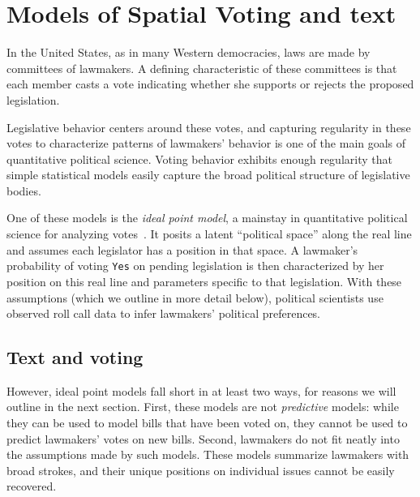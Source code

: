 \chapter{Models of Spatial Voting and text}
\label{chapter:spatial_voting}

In the United States, as in many Western democracies, laws are made by
committees of lawmakers.  A defining characteristic of these
committees is that each member casts a vote indicating whether she
supports or rejects the proposed legislation.

Legislative behavior centers around these votes, and capturing
regularity in these votes to characterize patterns of lawmakers'
behavior is one of the main goals of quantitative political science.
Voting behavior exhibits enough regularity that simple statistical
models easily capture the broad political structure of legislative
bodies.

One of these models is the \emph{ideal point model}, a mainstay in
quantitative political science for analyzing
votes~\cite{clinton:2004}.  It posits a latent ``political space''
along the real line and assumes each legislator has a position in that
space.
A lawmaker's probability of voting \verb!Yes! on
pending legislation is then characterized by her position on this real
line and parameters specific to that legislation.  With these
assumptions (which we outline in more detail below), political
scientists use observed roll call data to infer lawmakers' political
preferences.

\section*{Text and voting}
However, ideal point models fall short in at least two ways, for
reasons we will outline in the next section.  First, these models are
not \emph{predictive} models: while they can be used to model bills
that have been voted on, they cannot be used to predict lawmakers'
votes on new bills.  Second, lawmakers do not fit neatly into the
assumptions made by such models.  These models summarize lawmakers
with broad strokes, and their unique positions on individual issues
cannot be easily recovered.

